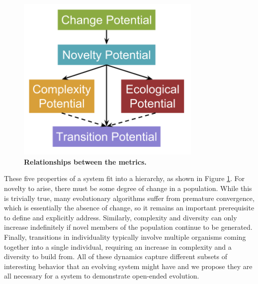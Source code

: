 \documentclass[letterpaper]{article}
\begin{document}
\begin{figure}
\includegraphics[width=3.5in]{figs/Complexity_Barriers.png}
\caption{\textbf{Relationships between the metrics.} }
\label{hierarchy}
\end{figure}
These five properties of a system fit into a hierarchy, as shown in Figure \ref{hierarchy}. For novelty to arise, there must be some degree of change in a population. While this is trivially true, many evolutionary algorithms suffer from premature convergence, which is essentially the absence of change, so it remains an important prerequisite to define and explicitly address. Similarly, complexity and diversity can only increase indefinitely if novel members of the population continue to be generated. Finally, transitions in individuality typically involve multiple organisms coming together into a single individual, requiring an increase in complexity and a diversity to build from.  All of these dynamics capture different subsets of interesting behavior that an evolving system might have and we propose they are all necessary for a system to demonstrate open-ended evolution.
\end{document}
